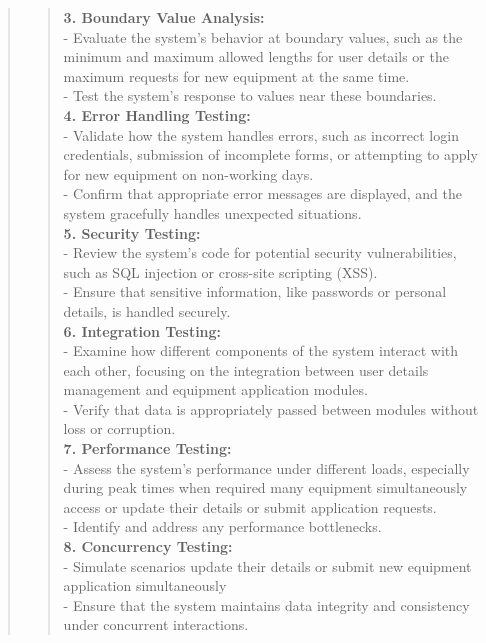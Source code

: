 \documentclass[12pt]{report}
\begin{document}
\begin{quote}
\begin{quote}
			\textbf{3. Boundary Value Analysis:}\\
			- Evaluate the system's behavior at boundary values, such as the minimum and maximum allowed lengths for user details or the maximum requests for new equipment at the same time.\\
			- Test the system's response to values near these boundaries.\\
			
			\textbf{4. Error Handling Testing:}\\
			- Validate how the system handles errors, such as incorrect login credentials, submission of incomplete forms, or attempting to apply for new equipment on non-working days.\\
			- Confirm that appropriate error messages are displayed, and the system gracefully handles unexpected situations.\\
			
			\textbf{5. Security Testing:}\\
			- Review the system's code for potential security vulnerabilities, such as SQL injection or cross-site scripting (XSS).\\
			- Ensure that sensitive information, like passwords or personal details, is handled securely.\\
			
			\textbf{6. Integration Testing:}\\
			- Examine how different components of the system interact with each other, focusing on the integration between user details management and equipment application modules.\\
			- Verify that data is appropriately passed between modules without loss or corruption.\\
			
			\textbf{7. Performance Testing:}\\
			- Assess the system's performance under different loads, especially during peak times when required many equipment simultaneously access or update their details or submit application requests.\\
			- Identify and address any performance bottlenecks.\\
			
			\textbf{8. Concurrency Testing:}\\
			- Simulate scenarios update their details or submit new equipment application simultaneously\\
			- Ensure that the system maintains data integrity and consistency under concurrent interactions.\\
			

\end{quote}
\end{quote}
\end{document}
